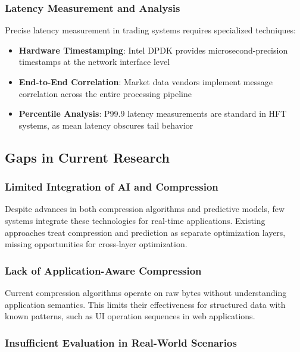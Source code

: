 \documentclass[12pt,a4paper]{article}
\begin{document}
\subsubsection{Latency Measurement and Analysis}

Precise latency measurement in trading systems requires specialized techniques:

\begin{itemize}
    \item \textbf{Hardware Timestamping}: Intel DPDK \cite{dpdk} provides microsecond-precision timestamps at the network interface level
    \item \textbf{End-to-End Correlation}: Market data vendors implement message correlation across the entire processing pipeline \cite{nyse-latency}
    \item \textbf{Percentile Analysis}: P99.9 latency measurements are standard in HFT systems, as mean latency obscures tail behavior \cite{dean2013}
\end{itemize}

\subsection{Gaps in Current Research}

\subsubsection{Limited Integration of AI and Compression}

Despite advances in both compression algorithms and predictive models, few systems integrate these technologies for real-time applications. Existing approaches treat compression and prediction as separate optimization layers, missing opportunities for cross-layer optimization.

\subsubsection{Lack of Application-Aware Compression}

Current compression algorithms operate on raw bytes without understanding application semantics. This limits their effectiveness for structured data with known patterns, such as UI operation sequences in web applications.

\subsubsection{Insufficient Evaluation in Real-World Scenarios}
\end{document}
